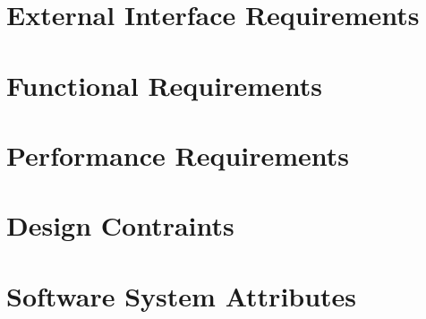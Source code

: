 \section{External Interface Requirements}

\section{Functional Requirements}

\section{Performance Requirements}

\section{Design Contraints}

\section{Software System Attributes}

